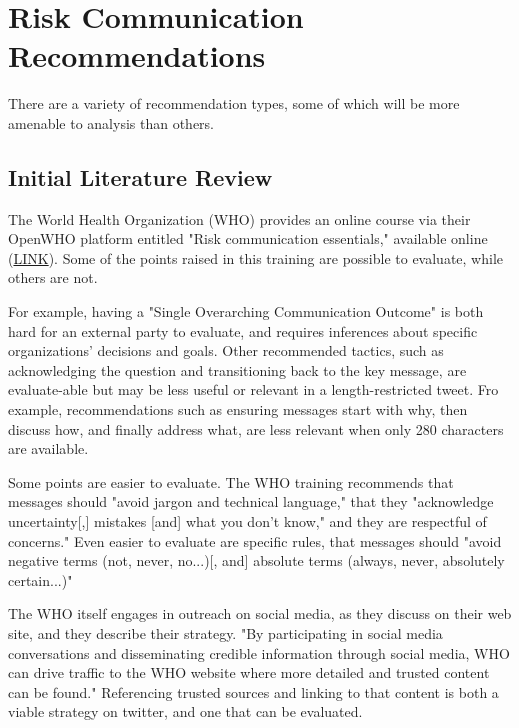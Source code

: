 \documentclass{article}
\begin{document}
\section{Risk Communication Recommendations}

There are a variety of recommendation types, some of which will be more amenable to analysis than others.

\subsection{Initial Literature Review}
The World Health Organization (WHO) provides an online course via their OpenWHO platform entitled "Risk communication essentials," available online (\href{https://openwho.org/courses/risk-communication}{LINK})\cite{OpenWHORiskComm2017}. Some of the points raised in this training are possible to evaluate, while others are not. 
 
For example, having a "Single Overarching Communication Outcome" is both hard for an external party to evaluate, and requires inferences about specific organizations' decisions and goals. Other recommended tactics, such as acknowledging the question and transitioning back to the key message, are evaluate-able but may be less useful or relevant in a length-restricted tweet. Fro example, recommendations such as ensuring messages start with why, then discuss how, and finally address what, are less relevant when only 280 characters are available.

Some points are easier to evaluate. The WHO training recommends that messages should "avoid jargon and technical language," that they "acknowledge uncertainty[,] mistakes [and] what you don't know," and they are respectful of concerns." Even easier to evaluate are specific rules, that messages should "avoid negative terms (not, never, no...)[, and] absolute terms (always, never, absolutely certain...)"

The WHO itself engages in outreach on social media, as they discuss on their web site\cite{WHOWebSocialMedia}, and they describe their strategy. "By participating in social media conversations and disseminating credible information through social media, WHO can drive traffic to the WHO website where more detailed and trusted content can be found." Referencing trusted sources and linking to that content is both a viable strategy on twitter, and one that can be evaluated.

\end{document}
